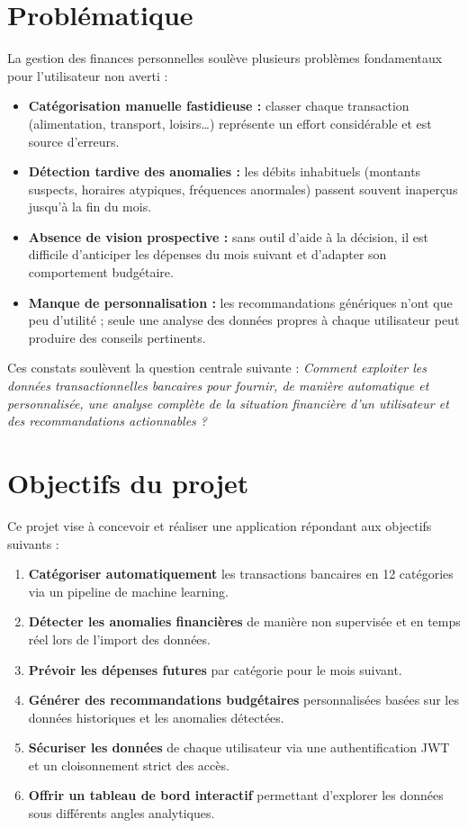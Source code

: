 \documentclass[12pt,a4paper]{report}
\begin{document}
\section{Problématique}

La gestion des finances personnelles soulève plusieurs problèmes fondamentaux
pour l'utilisateur non averti :

\begin{itemize}[noitemsep]
  \item \textbf{Catégorisation manuelle fastidieuse :} classer chaque transaction
    (alimentation, transport, loisirs…) représente un effort considérable et est
    source d'erreurs.
  \item \textbf{Détection tardive des anomalies :} les débits inhabituels
    (montants suspects, horaires atypiques, fréquences anormales) passent souvent
    inaperçus jusqu'à la fin du mois.
  \item \textbf{Absence de vision prospective :} sans outil d'aide à la décision,
    il est difficile d'anticiper les dépenses du mois suivant et d'adapter son
    comportement budgétaire.
  \item \textbf{Manque de personnalisation :} les recommandations génériques
    n'ont que peu d'utilité ; seule une analyse des données propres à chaque
    utilisateur peut produire des conseils pertinents.
\end{itemize}

Ces constats soulèvent la question centrale suivante : \textit{Comment exploiter
les données transactionnelles bancaires pour fournir, de manière automatique et
personnalisée, une analyse complète de la situation financière d'un utilisateur
et des recommandations actionnables ?}

\section{Objectifs du projet}

Ce projet vise à concevoir et réaliser une application répondant aux objectifs
suivants :

\begin{enumerate}[noitemsep]
  \item \textbf{Catégoriser automatiquement} les transactions bancaires en
    12 catégories via un pipeline de machine learning.
  \item \textbf{Détecter les anomalies financières} de manière non supervisée
    et en temps réel lors de l'import des données.
  \item \textbf{Prévoir les dépenses futures} par catégorie pour le mois suivant.
  \item \textbf{Générer des recommandations budgétaires} personnalisées basées
    sur les données historiques et les anomalies détectées.
  \item \textbf{Sécuriser les données} de chaque utilisateur via une
    authentification JWT et un cloisonnement strict des accès.
  \item \textbf{Offrir un tableau de bord interactif} permettant d'explorer
    les données sous différents angles analytiques.
\end{enumerate}
\end{document}
